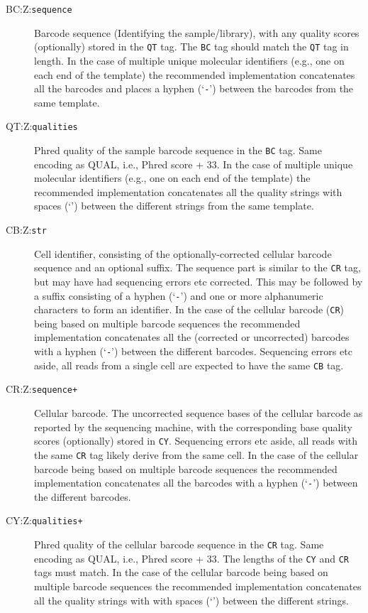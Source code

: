 \documentclass[10pt]{article}
\newcommand{\tagvalue}[1]{{\tt #1}}
\begin{document}
\begin{description}
\item[BC:Z:\tagvalue{sequence}]
Barcode sequence (Identifying the sample/library), with any quality scores (optionally) stored in the {\tt QT} tag.
The {\tt BC} tag should match the {\tt QT} tag in length. 
In the case of multiple unique molecular identifiers (e.g., one on each end of the template) the recommended implementation concatenates all the barcodes and places a hyphen (`{\tt -}') between the barcodes from the same template. 

\item[QT:Z:\tagvalue{qualities}] 
Phred quality of the sample barcode sequence in the {\tt BC} tag.
Same encoding as {\sf QUAL}, i.e., Phred score + 33.
In the case of multiple unique molecular identifiers (e.g., one on each end of the template) the recommended implementation concatenates all the quality strings with spaces (`{\tt \textvisiblespace}') between the different strings from the same template. 

\item[CB:Z:\tagvalue{str}]
Cell identifier, consisting of the optionally-corrected cellular barcode sequence and an optional suffix.
The sequence part is similar to the {\tt CR} tag, but may have had sequencing errors etc corrected.
This may be followed by a suffix consisting of a hyphen (`{\tt -}') and one or more alphanumeric characters to form an identifier.
In the case of the cellular barcode ({\tt CR}) being based on multiple barcode sequences the recommended implementation concatenates all the (corrected or uncorrected) barcodes with a hyphen (`{\tt -}') between the different barcodes.
Sequencing errors etc aside, all reads from a single cell are expected to have the same {\tt CB} tag.

\item[CR:Z:\tagvalue{sequence+}]
Cellular barcode. The uncorrected sequence bases of the cellular barcode as reported by the sequencing machine, with the corresponding base quality scores (optionally) stored in {\tt CY}.
Sequencing errors etc aside, all reads with the same {\tt CR} tag likely derive from the same cell.
In the case of the cellular barcode being based on multiple barcode sequences the recommended implementation concatenates all the barcodes with a hyphen (`{\tt -}') between the different barcodes.

\item[CY:Z:\tagvalue{qualities+}]
Phred quality of the cellular barcode sequence in the {\tt CR} tag.
Same encoding as {\sf QUAL}, i.e., Phred score + 33.
The lengths of the {\tt CY} and {\tt CR} tags must match.
In the case of the cellular barcode being based on multiple barcode sequences the recommended implementation concatenates all the quality strings with with spaces (`{\tt \textvisiblespace}') between the different strings.


\end{description}
\end{document}
